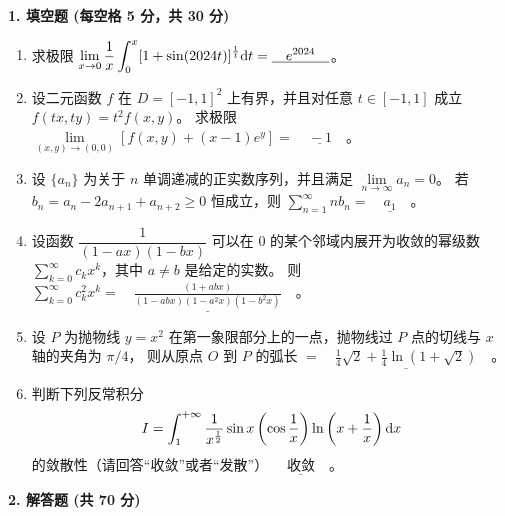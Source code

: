 \textbf{1. 填空题 (每空格 5 分，共 30 分)}
\begin{enumerate}[label=(\arabic*)]
\item 求极限 $\displaystyle\lim_{x \rightarrow 0} \frac{1}{x} \int_{0}^{x}[1+\sin (2024 t)]^{\frac{1}{t}} {\rm d} t=\underline{\quad e^{2024} \quad}$。
\item 设二元函数 $f$ 在 $D=[-1,1]^{2}$ 上有界，并且对任意 $t \in[-1, 1]$ 成立 $f(tx,ty)=t^{2} f(x,y)$。
求极限 $\lim\limits_{(x,y)\rightarrow(0,0)}\left[f(x,y)+(x-1)e^{y}\right]=\underline{\quad-1\quad}$。
\item 设 $\{a_{n}\}$ 为关于 $n$ 单调递减的正实数序列，并且满足 $\lim\limits_{n \rightarrow \infty} a_{n}=0$。
若 $b_{n}=a_{n}-2 a_{n+1}+a_{n+2} \geq 0$ 恒成立，则 $\displaystyle\sum_{n=1}^{\infty} nb_{n}=\underline{\quad a_1 \quad}$。
\item 设函数 $\dfrac{1}{(1-ax)(1-bx)}$ 可以在 $0$ 的某个邻域内展开为收敛的幂级数 
$\displaystyle\sum_{k=0}^{\infty} c_{k}x^{k}$，其中 $a \neq b$ 是给定的实数。
则 $\displaystyle\sum_{k=0}^{\infty} c_{k}^{2}x^{k}=\underline{\quad\frac{(1+abx)}{(1-abx)(1-a^{2}x){(1-b^{2}x)}}\quad}$。
\item 设 $P$ 为抛物线 $y=x^{2}$ 在第一象限部分上的一点，抛物线过 $P$ 点的切线与 $x$ 轴的夹角为 $\pi/4$，
则从原点 $O$ 到 $P$ 的弧长 $\displaystyle=\underline{\quad\frac{1}{4}\sqrt{2}+\frac{1}{4}\ln(1+\sqrt{2})\quad}$。
\item 判断下列反常积分
$$I=\int_{1}^{+\infty} \frac{1}{x^{\frac{1}{2}}} \sin x\left(\cos \frac{1}{x}\right) \ln \left(x+\frac{1}{x}\right) {\rm d} x$$
的敛散性（请回答``收敛''或者``发散''） $\underline{\quad\text{收敛}\quad}$。
\end{enumerate}
\textbf{2. 解答题 (共 70 分)}
